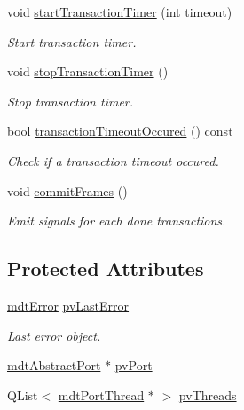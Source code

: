 \begin{DoxyCompactItemize}
void \hyperlink{classmdt_port_manager_adeeba5a216174fcc1d01446a9537f40e}{start\-Transaction\-Timer} (int timeout)
\begin{DoxyCompactList}\small\item\em Start transaction timer. \end{DoxyCompactList}\item 
void \hyperlink{classmdt_port_manager_a1467c0bd28612ae3116f5daba08c0b84}{stop\-Transaction\-Timer} ()
\begin{DoxyCompactList}\small\item\em Stop transaction timer. \end{DoxyCompactList}\item 
bool \hyperlink{classmdt_port_manager_a04fc12f0dc02e981cac8dc56539e63d2}{transaction\-Timeout\-Occured} () const 
\begin{DoxyCompactList}\small\item\em Check if a transaction timeout occured. \end{DoxyCompactList}\item 
void \hyperlink{classmdt_port_manager_a84d37b380080eb26e56c68424dedd958}{commit\-Frames} ()
\begin{DoxyCompactList}\small\item\em Emit signals for each done transactions. \end{DoxyCompactList}\end{DoxyCompactItemize}
\subsection*{Protected Attributes}
\begin{DoxyCompactItemize}
\item 
\hyperlink{classmdt_error}{mdt\-Error} \hyperlink{classmdt_port_manager_af03c1270cb19ce92e846cae95dc0769b}{pv\-Last\-Error}
\begin{DoxyCompactList}\small\item\em Last error object. \end{DoxyCompactList}\item 
\hyperlink{classmdt_abstract_port}{mdt\-Abstract\-Port} $\ast$ \hyperlink{classmdt_port_manager_af856162aab4f1c5202c1dfb330fae538}{pv\-Port}
\item 
Q\-List$<$ \hyperlink{classmdt_port_thread}{mdt\-Port\-Thread} $\ast$ $>$ \hyperlink{classmdt_port_manager_a8e0d49b789f8b01d469e84b487799573}{pv\-Threads}
\end{DoxyCompactItemize}


